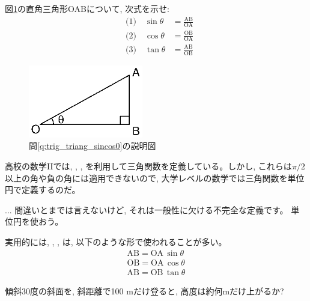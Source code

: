 \begin{q}\label{q:trig_triang_sincos0} 図\ref{fig:triangle_rect}の直角三角形OABについて, 
次式を示せ:
\begin{eqnarray}
&\text{(1) }\,\,\,\, \sin \theta&=\frac{\text{AB}}{\text{OA}}\label{eq:trig_defclassic_sin}\\
&\text{(2) }\,\,\,\, \cos \theta&=\frac{\text{OB}}{\text{OA}}\label{eq:trig_defclassic_cos}\\
&\text{(3) }\,\,\,\, \tan \theta&=\frac{\text{AB}}{\text{OB}}\label{eq:trig_defclassic_tan}
\end{eqnarray}\end{q}
\begin{figure}[h]
    \centering
    \includegraphics[width=5cm]{triangle_rect.eps}
    \caption{問\ref{q:trig_triang_sincos0}の説明図}\label{fig:triangle_rect}
\end{figure}

高校の数学IIでは, , , 
を利用して三角関数を定義している。しかし, これらは$\pi/2$
以上の角や負の角には適用できないので, 大学レベルの数学では三角関数を単位円で定義するのだ。

\begin{freqmiss}{\small{} ... 
間違いとまでは言えないけど, それは一般性に欠ける不完全な定義です。
単位円を使おう。}\end{freqmiss}

実用的には, , , 
は, 以下のような形で使われることが多い。
\begin{eqnarray}
\text{AB}=\text{OA}\,\sin \theta\label{eq:trig_defclassic_sin1}\\
\text{OB}=\text{OA}\,\cos \theta\label{eq:trig_defclassic_cos1}\\
\text{AB}=\text{OB}\,\tan \theta\label{eq:trig_defclassic_tan1}
\end{eqnarray}

\begin{q}\label{q:trig_triang_sincos1} 傾斜30度の斜面を, 斜距離で100 mだけ登ると, 高度は約何mだけ上がるか? 
\end{q}\mv

